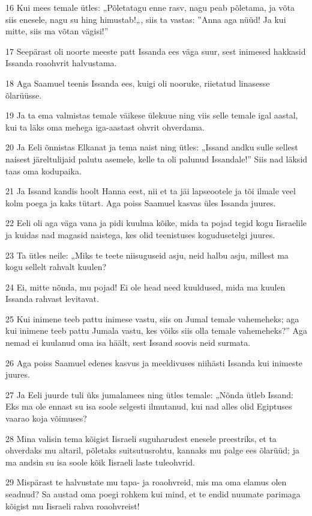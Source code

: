 \par 16 Kui mees temale ütles: „Põletatagu enne rasv, nagu peab põletama, ja võta siis enesele, nagu su hing himustab!„, siis ta vastas: ”Anna aga nüüd! Ja kui mitte, siis ma võtan vägisi!”
\par 17 Seepärast oli noorte meeste patt Issanda ees väga suur, sest inimesed hakkasid Issanda roaohvrit halvustama.
\par 18 Aga Saamuel teenis Issanda ees, kuigi oli nooruke, riietatud linasesse õlarüüsse.
\par 19 Ja ta ema valmistas temale väikese ülekuue ning viis selle temale igal aastal, kui ta läks oma mehega iga-aastast ohvrit ohverdama.
\par 20 Ja Eeli õnnistas Elkanat ja tema naist ning ütles: „Issand andku sulle sellest naisest järeltulijaid palutu asemele, kelle ta oli palunud Issandale!” Siis nad läksid taas oma kodupaika.
\par 21 Ja Issand kandis hoolt Hanna eest, nii et ta jäi lapseootele ja tõi ilmale veel kolm poega ja kaks tütart. Aga poiss Saamuel kasvas üles Issanda juures.
\par 22 Eeli oli aga väga vana ja pidi kuulma kõike, mida ta pojad tegid kogu Iisraelile ja kuidas nad magasid naistega, kes olid teenistuses kogudusetelgi juures.
\par 23 Ta ütles neile: „Miks te teete niisuguseid asju, neid halbu asju, millest ma kogu sellelt rahvalt kuulen?
\par 24 Ei, mitte nõnda, mu pojad! Ei ole head need kuuldused, mida ma kuulen Issanda rahvast levitavat.
\par 25 Kui inimene teeb pattu inimese vastu, siis on Jumal temale vahemeheks; aga kui inimene teeb pattu Jumala vastu, kes võiks siis olla temale vahemeheks?” Aga nemad ei kuulanud oma isa häält, sest Issand soovis neid surmata.
\par 26 Aga poiss Saamuel edenes kasvus ja meeldivuses niihästi Issanda kui inimeste juures.
\par 27 Ja Eeli juurde tuli üks jumalamees ning ütles temale: „Nõnda ütleb Issand: Eks ma ole ennast su isa soole selgesti ilmutanud, kui nad alles olid Egiptuses vaarao koja võimuses?
\par 28 Mina valisin tema kõigist Iisraeli suguharudest enesele preestriks, et ta ohverdaks mu altaril, põletaks suitsutusrohtu, kannaks mu palge ees õlarüüd; ja ma andsin su isa soole kõik Iisraeli laste tuleohvrid.
\par 29 Mispärast te halvustate mu tapa- ja roaohvreid, mis ma oma elamus olen seadnud? Sa austad oma poegi rohkem kui mind, et te endid nuumate parimaga kõigist mu Iisraeli rahva roaohvreist!
